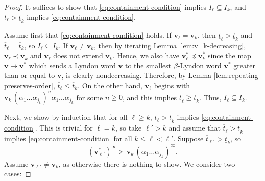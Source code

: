 \documentclass[11pt]{amsart}
\theoremstyle{definition}
\theoremstyle{remark}
\numberwithin{equation}{section}
\renewcommand{\v}{\mathbf{v}}
\newcommand{\f}{\infty}
\newcommand{\al}{\alpha}
\newcommand{\lle}{\preccurlyeq}
\begin{document}
\begin{proof}
It suffices to show that \eqref{eq:containment-condition} implies $I_{\ell}\subseteq I_k$, and $\overline{t}_{\ell}>\underline{t}_k$ implies \eqref{eq:containment-condition}.

Assume first that \eqref{eq:containment-condition} holds. If $\v_{\ell}=\v_k$, then $\underline{t}_{\ell}>\underline{t}_k$ and $\overline{t}_{\ell}=\overline{t}_k$, so $I_{\ell}\subseteq I_k$. If $\v_{\ell}\neq \v_k$, then by iterating Lemma \ref{lem:v_k-decreasing}, $\v_{\ell}\prec \v_k$ and $\v_{\ell}$ does not extend $\v_k$. Hence, we also have $\v_{\ell}^*\lle \v_k^*$ since the map $\v\mapsto \v^*$ which sends a Lyndon word $\v$ to the smallest $\beta$-Lyndon word $\v^*$ greater than or equal to $\v$, is clearly nondecreasing. Therefore, {by Lemma \ref{lem:repeating-preserves-order}}, $\overline{t}_{\ell}\leq \overline{t}_k$. On the other hand, $\v_\ell$ begins with $\v_k^-(\al_1\dots\al_{j_k}^-)^n\al_1\dots\al_{j_k}$ for some $n\geq 0$, and this implies $\underline{t}_\ell\geq \underline{t}_k$. Thus, $I_\ell\subseteq I_k$.

Next, we show by induction that for all $\ell\geq k$,
$\overline{t}_{\ell}>\underline{t}_k$ implies \eqref{eq:containment-condition}.
This is trivial for $\ell=k$, so take $\ell'>k$ and assume that $\overline{t}_{\ell}>\underline{t}_k$ implies \eqref{eq:containment-condition} for all $k\leq \ell<\ell'$. Suppose $\overline{t}_{\ell'}>\underline{t}_k$, so
\begin{equation} \label{eq:v_l-v_k-inequality}
(\v_{\ell'}^*)^\f \succ \v_k^-(\al_1\dots\al_{j_k}^-)^\f.
\end{equation}
Assume $\v_{\ell'}\neq \v_k$, as otherwise there is nothing to show.
We consider two cases:


\end{proof}
\end{document}

